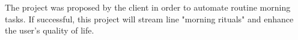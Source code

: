 The project was proposed by the client in order to automate routine morning tasks. If successful, this project will stream line "morning rituals" and enhance the user's quality of life.